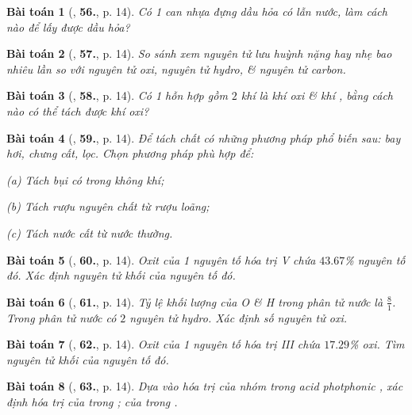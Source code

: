 \documentclass{article}
\numberwithin{equation}{section}
\newtheorem{baitoan}{Bài toán}[section]
\begin{document}
\begin{baitoan}[\cite{An2011}, \textbf{56.}, p. 14]
	Có 1 can nhựa đựng dầu hỏa có lẫn nước, làm cách nào để lấy được dầu hỏa?
\end{baitoan}

\begin{baitoan}[\cite{An2011}, \textbf{57.}, p. 14]
	So sánh xem nguyên tử lưu huỳnh nặng hay nhẹ bao nhiêu lần so với nguyên tử oxi, nguyên tử hydro, \& nguyên tử carbon.
\end{baitoan}

\begin{baitoan}[\cite{An2011}, \textbf{58.}, p. 14]
	Có 1 hỗn hợp gồm $2$ khí là khí oxi \& khí , bằng cách nào có  thể tách được khí oxi?
\end{baitoan}

\begin{baitoan}[\cite{An2011}, \textbf{59.}, p. 14]
	Để tách chất có những phương pháp phổ biến sau: bay hơi, chưng cất, lọc. Chọn phương pháp phù hợp để:
	\begin{enumerate*}
		\item[(a)] Tách bụi có trong không khí;
		\item[(b)] Tách rượu nguyên chất từ rượu loãng;
		\item[(c)] Tách nước cất từ nước thường.
	\end{enumerate*}
\end{baitoan}

\begin{baitoan}[\cite{An2011}, \textbf{60.}, p. 14]
	Oxit của 1 nguyên tố hóa trị V chứa $43.67$\% nguyên tố đó. Xác định nguyên tử khối của nguyên tố đó.
\end{baitoan}

\begin{baitoan}[\cite{An2011}, \textbf{61.}, p. 14]
	Tỷ lệ khối lượng của O \& H trong phân tử nước là $\frac{8}{1}$. Trong phân tử nước có $2$ nguyên tử hydro. Xác định số nguyên tử oxi.
\end{baitoan}

\begin{baitoan}[\cite{An2011}, \textbf{62.}, p. 14]
	Oxit của 1 nguyên tố hóa trị III chứa $17.29$\% oxi. Tìm nguyên tử khối của nguyên tố đó.
\end{baitoan}

\begin{baitoan}[\cite{An2011}, \textbf{63.}, p. 14]
	Dựa vào hóa trị của nhóm  trong acid photphonic , xác định hóa trị của  trong ; của  trong .
\end{baitoan}
\end{document}
